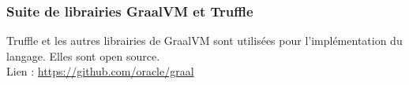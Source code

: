\documentclass[../report.tex]{subfiles}
\begin{document}
\subsubsection*{Suite de librairies GraalVM et Truffle}
Truffle et les autres librairies de GraalVM sont utilisées pour l'implémentation du langage. Elles sont open source.\\
Lien : \href{https://github.com/oracle/graal}{https://github.com/oracle/graal}
\renewcommand{\thesubsection}{\Alph{subsection}}
\setcounter{subsection}{0}



\end{document}
